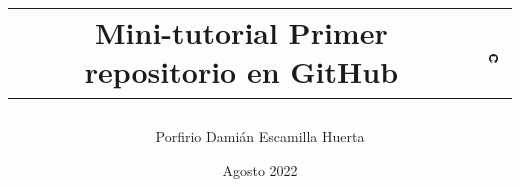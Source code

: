 

\title{
	\begin{tabular}{cc}
		Mini-tutorial Primer repositorio en GitHub & 
		\includegraphics[width=15px]{GitHub-Mark-120px-plus.png}
	\end{tabular}
}
\author{Porfirio Damián Escamilla Huerta}
\date{Agosto 2022}

\lstset{style=bashStyle}


	
	\maketitle
	\newpage
	
	
	
	
	
	
	

